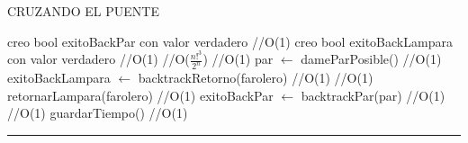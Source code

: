 \begin{algorithm}[H]
\caption{CRUZANDO EL PUENTE}
\begin{algorithmic}[1]
\state creo bool exitoBackPar con valor verdadero \hfill //O(1)
\state creo bool exitoBackLampara con valor verdadero \hfill //O(1)
 \hfill //O($\frac{n!^{3}}{2^{n}}$)
 \hfill //O(1)
\state par $\gets$ dameParPosible() \hfill //O(1)
\Else
\state exitoBackLampara $\gets$ backtrackRetorno(farolero) \hfill //O(1)
\endif
{} \hfill //O(1)
\state retornarLampara(farolero) \hfill //O(1)
\Else
\state exitoBackPar $\gets$ backtrackPar(par) \hfill //O(1)
\endif
{} \hfill //O(1)
\state guardarTiempo() \hfill //O(1)
\endif
\endwhile
\EndFunction 
\end{algorithmic}
\hrule
{}
\end{algorithm}


